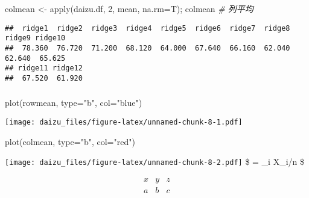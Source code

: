 \documentclass[
]{article}
\newenvironment{Shaded}{\begin{snugshade}}{\end{snugshade}}
\newcommand{\AttributeTok}[1]{\textcolor[rgb]{0.77,0.63,0.00}{#1}}
\newcommand{\CommentTok}[1]{\textcolor[rgb]{0.56,0.35,0.01}{\textit{#1}}}
\newcommand{\DecValTok}[1]{\textcolor[rgb]{0.00,0.00,0.81}{#1}}
\newcommand{\FunctionTok}[1]{\textcolor[rgb]{0.00,0.00,0.00}{#1}}
\newcommand{\NormalTok}[1]{#1}
\newcommand{\OtherTok}[1]{\textcolor[rgb]{0.56,0.35,0.01}{#1}}
\newcommand{\StringTok}[1]{\textcolor[rgb]{0.31,0.60,0.02}{#1}}
\begin{document}
\begin{Shaded}
\begin{Highlighting}[]
\NormalTok{    colmean }\OtherTok{\textless{}{-}} \FunctionTok{apply}\NormalTok{(daizu.df, }\DecValTok{2}\NormalTok{, mean, }\AttributeTok{na.rm=}\NormalTok{T); colmean       }\CommentTok{\# 列平均}
\end{Highlighting}
\end{Shaded}

\begin{verbatim}
##  ridge1  ridge2  ridge3  ridge4  ridge5  ridge6  ridge7  ridge8  ridge9 ridge10 
##  78.360  76.720  71.200  68.120  64.000  67.640  66.160  62.040  62.640  65.625 
## ridge11 ridge12 
##  67.520  61.920
\end{verbatim}

\hypertarget{section}{%
\subsubsection{}\label{section}}

\begin{Shaded}
\begin{Highlighting}[]
    \FunctionTok{plot}\NormalTok{(rowmean, }\AttributeTok{type=}\StringTok{"b"}\NormalTok{, }\AttributeTok{col=}\StringTok{"blue"}\NormalTok{) }
\end{Highlighting}
\end{Shaded}

\texttt{[image: daizu\_files/figure-latex/unnamed-chunk-8-1.pdf]}

\begin{Shaded}
\begin{Highlighting}[]
    \FunctionTok{plot}\NormalTok{(colmean, }\AttributeTok{type=}\StringTok{"b"}\NormalTok{, }\AttributeTok{col=}\StringTok{"red"}\NormalTok{)}
\end{Highlighting}
\end{Shaded}

\texttt{[image: daizu\_files/figure-latex/unnamed-chunk-8-2.pdf]} \$
 = \Sigma\_i X\_i/n \$

\[ 
\begin{array}{ccc}
x & y & z \\
a & b & c \\
\end{array} 
\]
\end{document}
